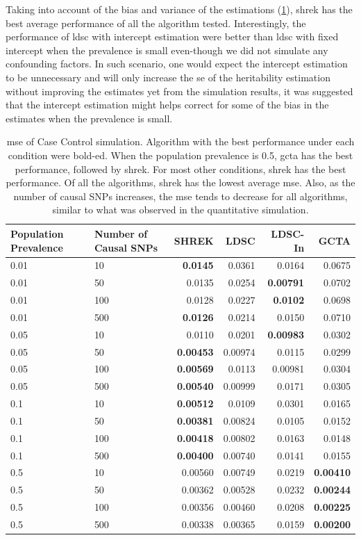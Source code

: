 \documentclass[12pt]{scrbook}
\begin{document}
Taking into account of the bias and variance of the estimations (\cref{tab:mseCC}), \gls{shrek} has the best average performance of all the algorithm tested.
Interestingly, the performance of \gls{ldsc} with intercept estimation were better than \gls{ldsc} with fixed intercept when the prevalence is small even-though we did not simulate any confounding factors.
In such scenario, one would expect the intercept estimation to be unnecessary and will only increase the \gls{se} of the heritability estimation without improving the estimates yet from the simulation results, it was suggested that the intercept estimation might helps correct for some of the bias in the estimates when the prevalence is small.
\begin{table}
	\centering
	\begin{tabular}{p{2cm}p{2.4cm}rrrr}
		\toprule
		Population Prevalence&	Number of Causal SNPs&	SHREK&	LDSC&	LDSC-In&	GCTA \\
		\midrule
		0.01&	10&	\textbf{0.0145}&	0.0361&	0.0164&	0.0675\\
		0.01&	50&	0.0135&	0.0254&	\textbf{0.00791}&	0.0702\\
		0.01&	100&	0.0128&	0.0227&	\textbf{0.0102}&	0.0698\\
		0.01&	500&	\textbf{0.0126}&	0.0214&	0.0150&	0.0710\\
		0.05&	10&	0.0110&	0.0201&	\textbf{0.00983}&	0.0302\\
		0.05&	50&	\textbf{0.00453}&	0.00974&	0.0115&	0.0299\\
		0.05&	100&	\textbf{0.00569}&	0.0113&	0.00981&	0.0304\\
		0.05&	500&	\textbf{0.00540}&	0.00999&	0.0171&	0.0305\\
		0.1&	10&	\textbf{0.00512}&	0.0109&	0.0301&	0.0165\\
		0.1&	50&	\textbf{0.00381}&	0.00824&	0.0105&	0.0152\\
		0.1&	100&	\textbf{0.00418}&	0.00802&	0.0163&	0.0148\\
		0.1&	500&	\textbf{0.00400}&	0.00740&	0.0141&	0.0155\\
		0.5&	10&	0.00560&	0.00749&	0.0219&	\textbf{0.00410}\\
		0.5&	50&	0.00362&	0.00528&	0.0232&	\textbf{0.00244}\\
		0.5&	100&	0.00356&	0.00460&	0.0208&	\textbf{0.00225}\\
		0.5&	500&	0.00338&	0.00365&	0.0159&	\textbf{0.00200}\\
		\bottomrule
	\end{tabular}
	\caption[MSE of Case Control Simulation]{
		\Gls{mse} of Case Control simulation.
		Algorithm with the best performance under each condition were bold-ed.
		When the population prevalence is 0.5, \gls{gcta} has the best performance, followed by \gls{shrek}.
		For most other conditions, \gls{shrek} has the best performance. 
		Of all the algorithms, \gls{shrek} has the lowest average \gls{mse}.
		Also, as the number of causal \glspl{SNP} increases, the \gls{mse} tends to decrease for all algorithms, similar to what was observed in the quantitative simulation. 
	}
	\label{tab:mseCC}
\end{table}
\end{document}
